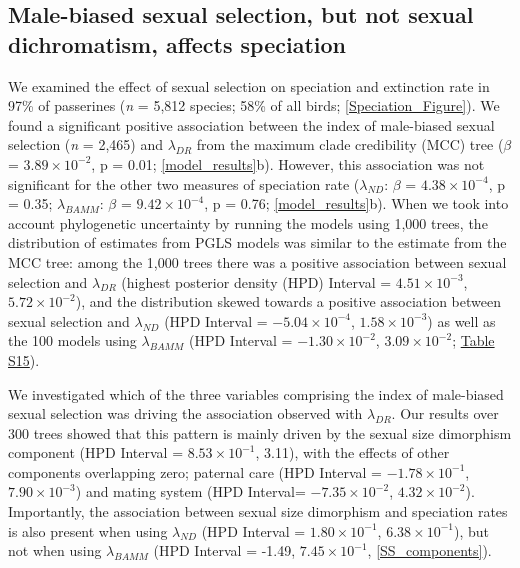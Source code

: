 \documentclass[]{article}
\begin{document}

\hypertarget{male-biased-sexual-selection-but-not-sexual-dichromatism-affects-speciation}{%
\subsection{Male-biased sexual selection, but not sexual dichromatism,
affects
speciation}\label{male-biased-sexual-selection-but-not-sexual-dichromatism-affects-speciation}}

We examined the effect of sexual selection on speciation and extinction
rate in 97\% of passerines (\emph{n} = 5,812 species; 58\% of all birds;
\autoref{Speciation_Figure}). We found a significant positive
association between the index of male-biased sexual selection (\emph{n}
= 2,465) and \(\lambda_{DR}\) from the maximum clade credibility (MCC)
tree (\(\beta\) = \(3.89 \times 10^{-2}\), p = 0.01;
\autoref{model_results}b). However, this association was not significant
for the other two measures of speciation rate (\(\lambda_{ND}\):
\(\beta\) = \(4.38 \times 10^{-4}\), p = 0.35; \(\lambda_{BAMM}\):
\(\beta\) = \(9.42 \times 10^{-4}\), p = 0.76;
\autoref{model_results}b). When we took into account phylogenetic
uncertainty by running the models using 1,000 trees, the distribution of
estimates from PGLS models was similar to the estimate from the MCC
tree: among the 1,000 trees there was a positive association between
sexual selection and \(\lambda_{DR}\) (highest posterior density (HPD)
Interval = \(4.51 \times 10^{-3}\), \(5.72 \times 10^{-2}\)), and the
distribution skewed towards a positive association between sexual
selection and \(\lambda_{ND}\) (HPD Interval = \(-5.04 \times 10^{-4}\),
\(1.58 \times 10^{-3}\)) as well as the 100 models using
\(\lambda_{BAMM}\) (HPD Interval = \(-1.30 \times 10^{-2}\),
\(3.09 \times 10^{-2}\);
\href{https://justincally.github.io/SexualSelection_Speciation/#analysis_using_male-biased_measure_of_sexual_selection}{Table S15}).

We investigated which of the three variables comprising the index of
male-biased sexual selection was driving the association observed with
\(\lambda_{DR}\). Our results over 300 trees showed that this pattern is
mainly driven by the sexual size dimorphism component (HPD Interval =
\(8.53 \times 10^{-1}\), 3.11), with the effects of other components
overlapping zero; paternal care (HPD Interval =
\(-1.78 \times 10^{-1}\), \(7.90 \times 10^{-3}\)) and mating system
(HPD Interval= \(-7.35 \times 10^{-2}\), \(4.32 \times 10^{-2}\)).
Importantly, the association between sexual size dimorphism and
speciation rates is also present when using \(\lambda_{ND}\) (HPD
Interval = \(1.80 \times 10^{-1}\), \(6.38 \times 10^{-1}\)), but not
when using \(\lambda_{BAMM}\) (HPD Interval = -1.49,
\(7.45 \times 10^{-1}\), \autoref{SS_components}).
\end{document}

